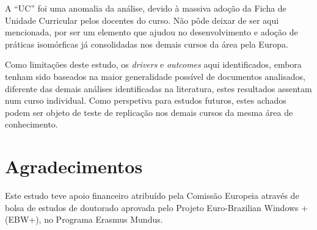 \documentclass{textolivre-html}
\begin{document}
A “UC” foi uma anomalia da análise, devido à massiva adoção da Ficha de Unidade Curricular pelos docentes do curso. Não pôde deixar de ser aqui mencionada, por ser um elemento que ajudou no desenvolvimento e adoção de práticas isomórficas já consolidadas nos demais cursos da área pela Europa.  

Como limitações deste estudo, os \textit{drivers} e \textit{outcomes} aqui identificados, embora tenham sido baseados na maior generalidade possível de documentos analisados, diferente das demais análises identificadas na literatura, estes resultados assentam num curso individual. Como perspetiva para estudos futuros, estes achados podem ser objeto de teste de replicação nos demais cursos da mesma área de conhecimento.

\section{Agradecimentos}\label{sec-agradecimentos}
Este estudo teve apoio financeiro atribuído pela Comissão Europeia através de bolsa de estudos de doutorado aprovada pelo Projeto Euro-Brazilian Windows + (EBW+), no Programa Erasmus Mundus.

\printbibliography\label{sec-bib}
\end{document}
